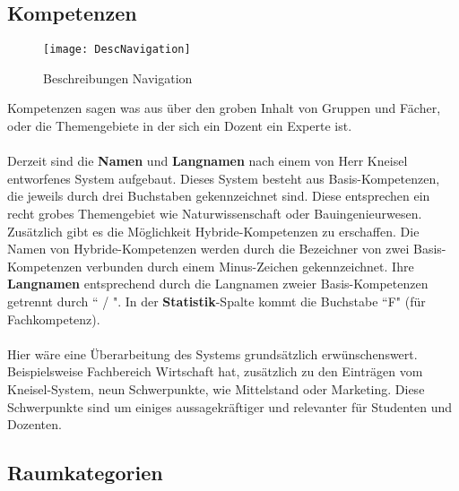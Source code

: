 \documentclass[]{report}
\begin{document}
\newpage
\subsection{Kompetenzen}
\label{subsec:kompetenzen}

\begin{wrapfigure}{r}{0.4\textwidth}
	\vspace{-15pt}
	\texttt{[image: DescNavigation]}
	\vspace{-25pt}
	\caption{Beschreibungen Navigation}
	\label{fig:description-navigation}
\end{wrapfigure}

Kompetenzen sagen was aus über den groben Inhalt von Gruppen und Fächer, oder die Themengebiete in der sich ein Dozent ein Experte ist.\\
\\
Derzeit sind die \textbf{Namen} und \textbf{Langnamen} nach einem von Herr Kneisel entworfenes System aufgebaut. Dieses System besteht aus Basis-Kompetenzen, die jeweils durch drei Buchstaben gekennzeichnet sind. Diese entsprechen ein recht grobes Themengebiet wie Naturwissenschaft oder Bauingenieurwesen. Zusätzlich gibt es die Möglichkeit Hybride-Kompetenzen zu erschaffen. Die Namen von Hybride-Kompetenzen werden durch die Bezeichner von zwei Basis-Kompetenzen verbunden durch einem Minus-Zeichen gekennzeichnet. Ihre \textbf{Langnamen} entsprechend durch die Langnamen zweier Basis-Kompetenzen getrennt durch `` / ". In der \textbf{Statistik}-Spalte kommt die Buchstabe ``F" (für Fachkompetenz).\\
\\
Hier wäre eine Überarbeitung des Systems grundsätzlich erwünschenswert. Beispielsweise Fachbereich Wirtschaft hat, zusätzlich zu den Einträgen vom Kneisel-System, neun Schwerpunkte, wie Mittelstand oder Marketing. Diese Schwerpunkte sind um einiges aussagekräftiger und relevanter für Studenten und Dozenten.

\subsection{Raumkategorien}
\label{subsec:roomcategory}
\end{document}
